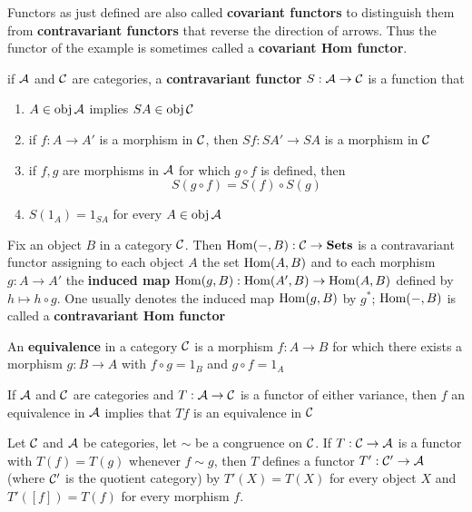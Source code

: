 \documentclass[11pt]{article}
\begin{document}
Functors as just defined are also called \textbf{covariant functors} to distinguish them from
\textbf{contravariant functors} that reverse the direction of arrows. Thus the functor of the example  is
sometimes called a \textbf{covariant Hom functor}.

\begin{definition}[]
if \(\mathcal{A}\) and \(\mathcal{C}\) are categories, a \textbf{contravariant functor} \(S:\mathcal{A}\to\mathcal{C}\) is a function that
\begin{enumerate}
\item \(A\in\operatorname{obj}\mathcal{A}\) implies \(SA\in\operatorname{obj}\mathcal{C}\)
\item if \(f:A\to A'\) is a morphism in \(\mathcal{C}\), then \(Sf:SA'\to SA\) is a morphism in \(\mathcal{C}\)
\item if \(f,g\) are morphisms in \(\mathcal{A}\) for which \(g\circ f\) is defined, then
\begin{equation*}
S(g\circ f)=S(f)\circ S(g)
\end{equation*}
\item \(S(1_A)=1_{SA}\) for every \(A\in\operatorname{obj}\mathcal{A}\)
\end{enumerate}
\end{definition}

\begin{examplle}[]
Fix an object \(B\) in a category \(\mathcal{C}\). Then \(\operatorname{Hom}(-,B):\mathcal{C}\to\operatorname{\textbf{Sets}}\) is a contravariant functor
assigning to each object \(A\) the set \(\operatorname{Hom}(A,B)\) and to each morphism \(g:A\to A'\) the
\textbf{induced map} \(\operatorname{Hom}(g,B):\operatorname{Hom}(A',B)\to\operatorname{Hom}(A,B)\) defined by \(h\mapsto h\circ g\). One usually denotes the
induced map \(\operatorname{Hom}(g,B)\) by \(g^*\); \(\operatorname{Hom}(-,B)\) is called a \textbf{contravariant Hom functor}
\end{examplle}

\begin{definition}[]
An \textbf{equivalence} in a category \(\mathcal{C}\) is a morphism \(f:A\to B\) for which there exists a
morphism \(g:B\to A\) with \(f\circ g=1_B\) and \(g\circ f=1_A\)
\end{definition}

\begin{theorem}[]
If \(\mathcal{A}\) and \(\mathcal{C}\) are categories and \(T:\mathcal{A}\to\mathcal{C}\) is a functor of either variance, then \(f\) an
equivalence in \(\mathcal{A}\) implies that \(Tf\) is an equivalence in \(\mathcal{C}\)
\end{theorem}

\begin{exercise}
\label{ex0.17}
Let \(\mathcal{C}\) and \(\mathcal{A}\) be categories, let \(\sim\) be a congruence on \(\mathcal{C}\). If \(T:\mathcal{C}\to\mathcal{A}\) is a functor
with \(T(f)=T(g)\) whenever \(f\sim g\), then \(T\) defines a functor \(T':\mathcal{C}'\to\mathcal{A}\) (where \(\mathcal{C}'\) is
the quotient category) by \(T'(X)=T(X)\) for every object \(X\) and \(T'([f])=T(f)\) for every
morphism \(f\).
\end{exercise}
\end{document}
